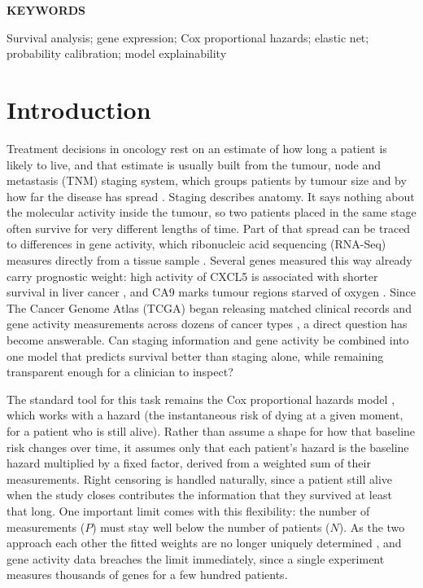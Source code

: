 \documentclass[10pt,a4paper]{article}
\begin{document}
\vspace{1em}
{\bfseries KEYWORDS\par}

Survival analysis; gene expression; Cox proportional hazards; elastic net;
probability calibration; model explainability

\vspace{3pt}

\section{Introduction}

Treatment decisions in oncology rest on an estimate of how long a patient is
likely to live, and that estimate is usually built from the tumour, node and
metastasis (TNM) staging system, which groups patients by tumour size and by how
far the disease has spread \citep{amin2017ajcc}. Staging describes anatomy. It says
nothing about the molecular activity inside the tumour, so two patients placed in
the same stage often survive for very different lengths of time. Part of that
spread can be traced to differences in gene activity, which ribonucleic acid
sequencing (RNA-Seq) measures directly from a tissue sample \citep{li2011rsem}.
Several genes measured this way already carry prognostic weight: high activity of
CXCL5 is associated with shorter survival in liver cancer
\citep{zhou2012overexpression}, and CA9 marks tumour regions starved of oxygen
\citep{giatromanolaki2001carbonic}. Since The Cancer Genome Atlas (TCGA) began
releasing matched clinical records and gene activity measurements across dozens of
cancer types \citep{weinstein2013cancer}, a direct question has become answerable.
Can staging information and gene activity be combined into one model that predicts
survival better than staging alone, while remaining transparent enough for a
clinician to inspect?

The standard tool for this task remains the Cox proportional hazards model
\citep{cox1972regression}, which works with a hazard (the instantaneous risk of
dying at a given moment, for a patient who is still alive). Rather than assume a
shape for how that baseline risk changes over time, it assumes only that each
patient's hazard is the baseline hazard multiplied by a fixed factor, derived from
a weighted sum of their measurements. Right censoring is handled naturally, since
a patient still alive when the study closes contributes the information that they
survived at least that long. One important limit comes with this flexibility: the
number of measurements ($P$) must stay well below the number of patients ($N$). As
the two approach each other the fitted weights are no longer uniquely determined
\citep{tibshirani1997lasso}, and gene activity data breaches the limit immediately,
since a single experiment measures thousands of genes for a few hundred patients.
\end{document}
